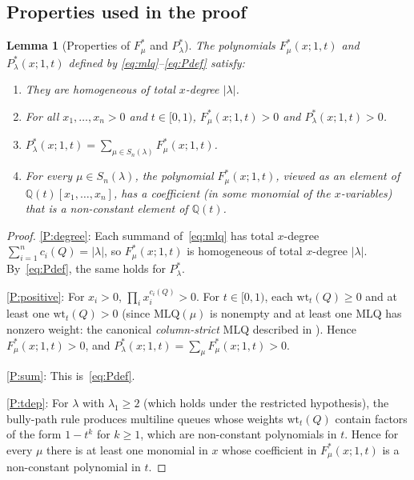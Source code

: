 \documentclass[12pt]{article}
\newtheorem{lemma}[theorem]{Lemma}
\theoremstyle{definition}
\begin{document}
\subsection{Properties used in the proof}

\begin{lemma}[Properties of $F^*_\mu$ and $P^*_\lambda$]\label{lem:props}
The polynomials $F^*_\mu(x;1,t)$ and $P^*_\lambda(x;1,t)$ defined by
\eqref{eq:mlq}--\eqref{eq:Pdef} satisfy:
\begin{enumerate}[label=\textnormal{(P\arabic*)}]
\item\label{P:degree} They are homogeneous of total $x$-degree $|\lambda|$.
\item\label{P:positive} For all $x_1,\dots,x_n>0$ and $t\in[0,1)$,
$F^*_\mu(x;1,t)>0$ and $P^*_\lambda(x;1,t)>0$.
\item\label{P:sum} $P^*_\lambda(x;1,t)=\sum_{\mu\in S_n(\lambda)}
F^*_\mu(x;1,t)$.
\item\label{P:tdep} For every $\mu\in S_n(\lambda)$, the polynomial
$F^*_\mu(x;1,t)$, viewed as an element of $\mathbb{Q}(t)[x_1,\dots,x_n]$,
has a coefficient (in some monomial of the $x$-variables) that is a
non-constant element of $\mathbb{Q}(t)$.
\end{enumerate}
\end{lemma}

\begin{proof}
\ref{P:degree}: Each summand of~\eqref{eq:mlq} has total $x$-degree
$\sum_{i=1}^n c_i(Q)=|\lambda|$, so $F^*_\mu(x;1,t)$ is homogeneous of
total $x$-degree $|\lambda|$. By~\eqref{eq:Pdef}, the same holds for
$P^*_\lambda$.

\ref{P:positive}: For $x_i>0$, $\prod_i x_i^{c_i(Q)}>0$. For $t\in[0,1)$,
each $\mathrm{wt}_t(Q)\ge 0$ and at least one $\mathrm{wt}_t(Q)>0$
(since $\mathrm{MLQ}(\mu)$ is nonempty and at least one MLQ has nonzero
weight: the canonical \emph{column-strict} MLQ described in
\cite[Section~2.4]{CMW}). Hence $F^*_\mu(x;1,t)>0$, and
$P^*_\lambda(x;1,t)=\sum_\mu F^*_\mu(x;1,t)>0$.

\ref{P:sum}: This is~\eqref{eq:Pdef}.

\ref{P:tdep}: For $\lambda$ with $\lambda_1\ge 2$ (which holds under the
restricted hypothesis), the bully-path rule
\cite[Section~2.4]{CMW} produces multiline queues whose weights
$\mathrm{wt}_t(Q)$ contain factors of the form $1-t^k$ for $k\ge 1$,
which are non-constant polynomials in $t$. Hence for every $\mu$ there
is at least one monomial in $x$ whose coefficient in $F^*_\mu(x;1,t)$
is a non-constant polynomial in $t$.
\end{proof}
\end{document}
